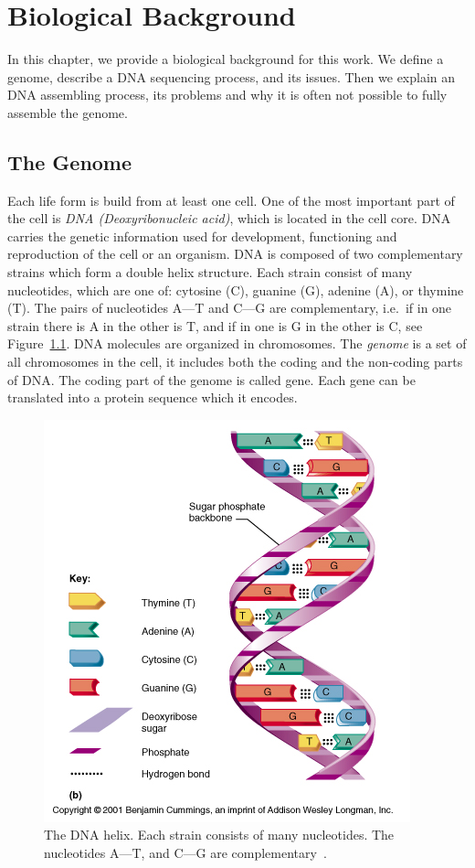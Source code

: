 \chapter{Biological Background}\label{chap:biointro}

In this chapter, we provide a biological background for this work.
We define a genome, describe a DNA sequencing process, and its issues. Then we explain an DNA assembling process, its problems and why it is often not possible to fully assemble the genome.

\section{The Genome}

Each life form is build from at least one cell. One of the most important part of the cell is \emph{DNA (Deoxyribonucleic acid)}, which is located in the cell core.
DNA carries the genetic information used for development, functioning and reproduction of the cell or an organism.
DNA is composed of two complementary strains which form a double helix structure. Each strain consist of many nucleotides, which are one of: cytosine (C), guanine (G), adenine (A), or thymine (T).
The pairs of nucleotides A---T and C---G are complementary, i.e.\ if in one strain there is A in the other is T, and if in one is G in the other is C, see Figure~\ref{fig:dnahelix}.
DNA molecules are organized in chromosomes.
The \emph{genome} is a set of all chromosomes in the cell, it includes both the coding and the non-coding parts of DNA.\@
The coding part of the genome is called gene. Each gene can be translated into a protein sequence which it encodes.

\begin{figure}[htbp]
  \centering
  \includegraphics[width=.5\textwidth]{../figures/dna-helix}
  \caption[DNA helix]{The DNA helix. Each strain consists of many nucleotides. The nucleotides A---T, and C---G are complementary~\cite{dnahelix}.}\label{fig:dnahelix}
\end{figure}

